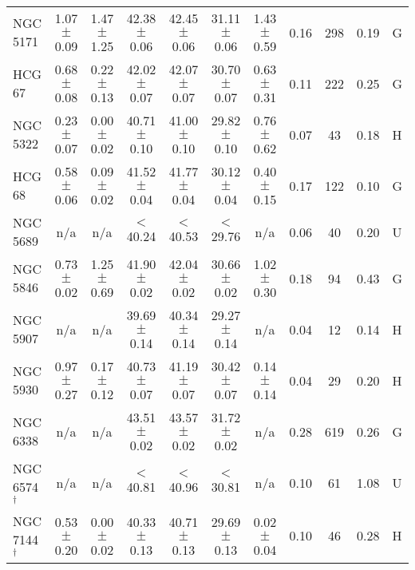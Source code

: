 \begin{table*}
\begin{center}
\begin{tabular}{@{}lcccccccccl@{}}
NGC 5171             &  1.07 $\pm$ 0.09  &  1.47 $\pm$ 1.25  &  42.38 $\pm$ 0.06  &  42.45  $\pm$ 0.06  &  31.11 $\pm$ 0.06  &  1.43 $\pm$ 0.59  &  0.16         &  298                &  0.19                &  G      \\
HCG 67               &  0.68 $\pm$ 0.08  &  0.22 $\pm$ 0.13  &  42.02 $\pm$ 0.07  &  42.07  $\pm$ 0.07  &  30.70 $\pm$ 0.07  &  0.63 $\pm$ 0.31  &  0.11         &  222                &  0.25                &  G      \\
NGC 5322             &  0.23 $\pm$ 0.07  &  0.00 $\pm$ 0.02  &  40.71 $\pm$ 0.10  &  41.00  $\pm$ 0.10  &  29.82 $\pm$ 0.10  &  0.76 $\pm$ 0.62  &  0.07         &  43                 &  0.18                &  H      \\
HCG 68               &  0.58 $\pm$ 0.06  &  0.09 $\pm$ 0.02  &  41.52 $\pm$ 0.04  &  41.77  $\pm$ 0.04  &  30.12 $\pm$ 0.04  &  0.40 $\pm$ 0.15  &  0.17         &  122                &  0.10                &  G      \\
NGC 5689             &  n/a              &  n/a              &  $<$40.24          &  $<$40.53           &  $<$29.76          &  n/a              &  0.06         &  40                 &  0.20                &  U      \\
NGC 5846             &  0.73 $\pm$ 0.02  &  1.25 $\pm$ 0.69  &  41.90 $\pm$ 0.02  &  42.04  $\pm$ 0.02  &  30.66 $\pm$ 0.02  &  1.02 $\pm$ 0.30  &  0.18         &  94                 &  0.43                &  G      \\
NGC 5907             &  n/a              &  n/a              &  39.69 $\pm$ 0.14  &  40.34  $\pm$ 0.14  &  29.27 $\pm$ 0.14  &  n/a              &  0.04         &  12                 &  0.14                &  H      \\
NGC 5930             &  0.97 $\pm$ 0.27  &  0.17 $\pm$ 0.12  &  40.73 $\pm$ 0.07  &  41.19  $\pm$ 0.07  &  30.42 $\pm$ 0.07  &  0.14 $\pm$ 0.14  &  0.04         &  29                 &  0.20                &  H      \\
NGC 6338             &  n/a              &  n/a              &  43.51 $\pm$ 0.02  &  43.57  $\pm$ 0.02  &  31.72 $\pm$ 0.02  &  n/a              &  0.28         &  619                &  0.26                &  G      \\
NGC 6574$^{\dagger}$ &  n/a              &  n/a              &  $<$40.81          &  $<$40.96           &  $<$30.81          &  n/a              &  0.10         &  61                 &  1.08                &  U      \\
NGC 7144$^{\dagger}$ &  0.53 $\pm$ 0.20  &  0.00 $\pm$ 0.02  &  40.33 $\pm$ 0.13  &  40.71  $\pm$ 0.13  &  29.69 $\pm$ 0.13  &  0.02 $\pm$ 0.04  &  0.10         &  46                 &  0.28                &  H      \\

\end{tabular}
\end{center}
\end{table*}
